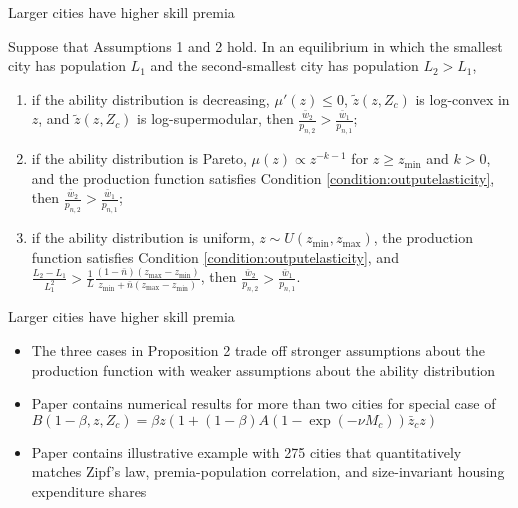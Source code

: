 \documentclass[10pt,notes=hide]{beamer}
\begin{document}
\begin{frame}{Larger cities have higher skill premia}
\begin{proposition} \label{prop:skillpremia}
Suppose that Assumptions 1 and 2 hold.
In an equilibrium in which the smallest city has population $L_{1}$ and the second-smallest city has population $L_{2}>L_{1}$,
\begin{enumerate}
\item if the ability distribution is decreasing, $\mu'(z)\leq0$, $\tilde{z}(z,Z_{c})$ is log-convex in $z$, and $\tilde{z}(z,Z_{c})$ is log-supermodular, then $\frac{\bar{w}_{2}}{p_{n,2}}>\frac{\bar{w}_{1}}{p_{n,1}}$;
\item if the ability distribution is Pareto, $\mu(z)\propto z^{-k-1}$ for $z\geq z_{\min}$ and $k>0$, and the production function satisfies Condition \ref{condition:outputelasticity}, then $\frac{\bar{w}_{2}}{p_{n,2}}>\frac{\bar{w}_{1}}{p_{n,1}}$;
\item if the ability distribution is uniform, $z\sim U\left(z_{\min},z_{\max}\right)$, the production function satisfies Condition \ref{condition:outputelasticity}, and $\frac{L_2 - L_1}{L_1^2} > \frac{1}{L}\frac{(1-\bar{n})(z_{\max} - z_{\min})}{z_{\min} +\bar{n}(z_{\max} - z_{\min})}$, then $\frac{\bar{w}_{2}}{p_{n,2}}>\frac{\bar{w}_{1}}{p_{n,1}}$.
\end{enumerate}
\end{proposition}
\end{frame}
\begin{frame}{Larger cities have higher skill premia}
\begin{itemize}
	\item The three cases in Proposition 2 trade off stronger assumptions about the production function with weaker assumptions about the ability distribution
	\item Paper contains numerical results for more than two cities for special case of
	$B(1-\beta,z,Z_c) = {\beta}z(1+(1-\beta)A\left(1-\exp(-\nu M_c) \right) \bar{z}_{c} z)$
	\item Paper contains illustrative example with 275 cities that quantitatively matches Zipf's law, premia-population correlation, and size-invariant housing expenditure shares
\end{itemize}
\end{frame}
\end{document}
